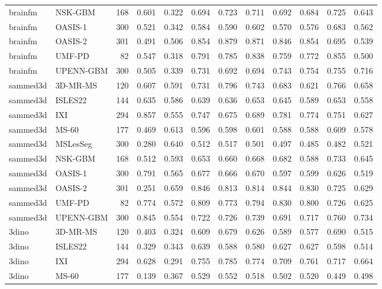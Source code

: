 \begin{tabular}{llrrrrrrrrrr}
brainfm & NSK-GBM & 168 & 0.601 & 0.322 & 0.694 & 0.723 & 0.711 & 0.692 & 0.684 & 0.725 & 0.643 \\
brainfm & OASIS-1 & 300 & 0.521 & 0.342 & 0.584 & 0.590 & 0.602 & 0.570 & 0.576 & 0.683 & 0.562 \\
brainfm & OASIS-2 & 301 & 0.491 & 0.506 & 0.854 & 0.879 & 0.871 & 0.846 & 0.854 & 0.695 & 0.539 \\
brainfm & UMF-PD & 82 & 0.547 & 0.318 & 0.791 & 0.785 & 0.838 & 0.759 & 0.772 & 0.855 & 0.500 \\
brainfm & UPENN-GBM & 300 & 0.505 & 0.339 & 0.731 & 0.692 & 0.694 & 0.743 & 0.754 & 0.755 & 0.716 \\
sammed3d & 3D-MR-MS & 120 & 0.607 & 0.591 & 0.731 & 0.796 & 0.743 & 0.683 & 0.621 & 0.766 & 0.658 \\
sammed3d & ISLES22 & 144 & 0.635 & 0.586 & 0.639 & 0.636 & 0.653 & 0.645 & 0.589 & 0.653 & 0.558 \\
sammed3d & IXI & 294 & 0.857 & 0.555 & 0.747 & 0.675 & 0.689 & 0.781 & 0.774 & 0.751 & 0.627 \\
sammed3d & MS-60 & 177 & 0.469 & 0.613 & 0.596 & 0.598 & 0.601 & 0.588 & 0.588 & 0.609 & 0.578 \\
sammed3d & MSLesSeg & 300 & 0.280 & 0.640 & 0.512 & 0.517 & 0.501 & 0.497 & 0.485 & 0.482 & 0.521 \\
sammed3d & NSK-GBM & 168 & 0.512 & 0.593 & 0.653 & 0.660 & 0.668 & 0.682 & 0.588 & 0.733 & 0.645 \\
sammed3d & OASIS-1 & 300 & 0.791 & 0.565 & 0.677 & 0.666 & 0.670 & 0.597 & 0.599 & 0.626 & 0.519 \\
sammed3d & OASIS-2 & 301 & 0.251 & 0.659 & 0.846 & 0.813 & 0.814 & 0.844 & 0.830 & 0.725 & 0.629 \\
sammed3d & UMF-PD & 82 & 0.774 & 0.572 & 0.809 & 0.773 & 0.794 & 0.830 & 0.800 & 0.726 & 0.625 \\
sammed3d & UPENN-GBM & 300 & 0.845 & 0.554 & 0.722 & 0.726 & 0.739 & 0.691 & 0.717 & 0.760 & 0.734 \\
3dino & 3D-MR-MS & 120 & 0.403 & 0.324 & 0.609 & 0.679 & 0.626 & 0.589 & 0.577 & 0.690 & 0.515 \\
3dino & ISLES22 & 144 & 0.329 & 0.343 & 0.639 & 0.588 & 0.580 & 0.627 & 0.627 & 0.598 & 0.514 \\
3dino & IXI & 294 & 0.628 & 0.291 & 0.755 & 0.785 & 0.774 & 0.709 & 0.761 & 0.717 & 0.664 \\
3dino & MS-60 & 177 & 0.139 & 0.367 & 0.529 & 0.552 & 0.518 & 0.502 & 0.520 & 0.449 & 0.498 \\

\end{tabular}
